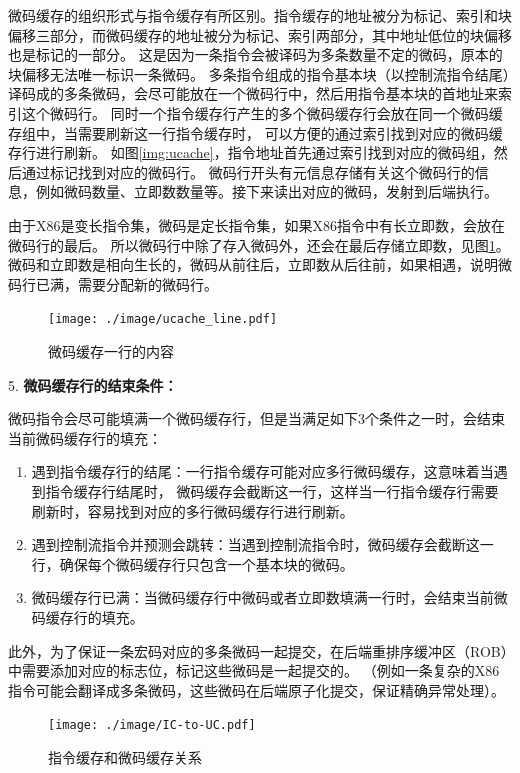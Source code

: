 微码缓存的组织形式与指令缓存有所区别。指令缓存的地址被分为标记、索引和块偏移三部分，而微码缓存的地址被分为标记、索引两部分，其中地址低位的块偏移也是标记的一部分。
这是因为一条指令会被译码为多条数量不定的微码，原本的块偏移无法唯一标识一条微码。
多条指令组成的指令基本块（以控制流指令结尾）译码成的多条微码，会尽可能放在一个微码行中，然后用指令基本块的首地址来索引这个微码行。
同时一个指令缓存行产生的多个微码缓存行会放在同一个微码缓存组中，当需要刷新这一行指令缓存时， 可以方便的通过索引找到对应的微码缓存行进行刷新。
如图\ref{img:ucache}，指令地址首先通过索引找到对应的微码组，然后通过标记找到对应的微码行。
微码行开头有元信息存储有关这个微码行的信息，例如微码数量、立即数数量等。接下来读出对应的微码，发射到后端执行。

由于X86是变长指令集，微码是定长指令集，如果X86指令中有长立即数，会放在微码行的最后。
所以微码行中除了存入微码外，还会在最后存储立即数，见图\ref{img:ucache_line}。
微码和立即数是相向生长的，微码从前往后，立即数从后往前，如果相遇，说明微码行已满，需要分配新的微码行。

\begin{figure}[!htbp]
  \centering
  \texttt{[image: ./image/ucache\_line.pdf]}
  \caption{微码缓存一行的内容}
  \label{img:ucache_line}
\end{figure}

5. \textbf{微码缓存行的结束条件：}

微码指令会尽可能填满一个微码缓存行，但是当满足如下3个条件之一时，会结束当前微码缓存行的填充\cite{solomonMicrooperationCachePower2001}：
\begin{enumerate}
  \item 遇到指令缓存行的结尾：一行指令缓存可能对应多行微码缓存，这意味着当遇到指令缓存行结尾时，
  微码缓存会截断这一行，这样当一行指令缓存行需要刷新时，容易找到对应的多行微码缓存行进行刷新。
  \item 遇到控制流指令并预测会跳转：当遇到控制流指令时，微码缓存会截断这一行，确保每个微码缓存行只包含一个基本块的微码。
  \item 微码缓存行已满：当微码缓存行中微码或者立即数填满一行时，会结束当前微码缓存行的填充。
\end{enumerate}

此外，为了保证一条宏码对应的多条微码一起提交，在后端重排序缓冲区（ROB）中需要添加对应的标志位，标记这些微码是一起提交的。
（例如一条复杂的X86指令可能会翻译成多条微码，这些微码在后端原子化提交，保证精确异常处理）。

\begin{figure}[!htbp]
  \centering
  \texttt{[image: ./image/IC-to-UC.pdf]}
  \caption{指令缓存和微码缓存关系}
  \label{img:IC_to_UC}
\end{figure}

